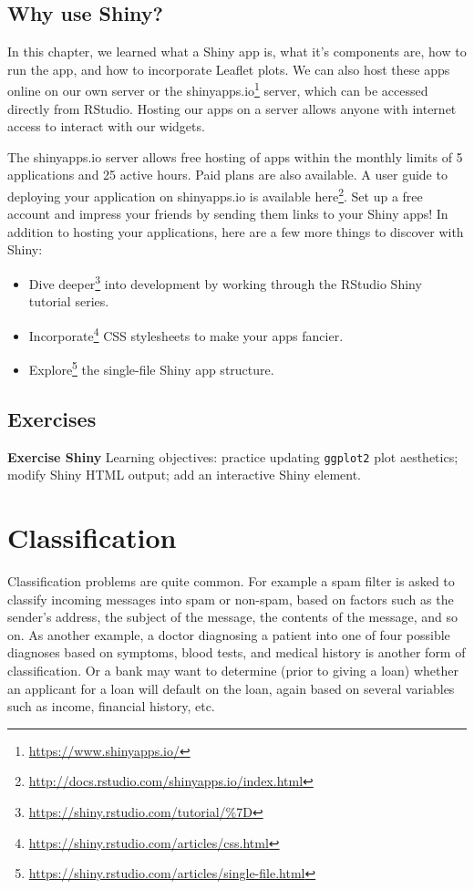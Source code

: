 \documentclass[]{krantz}
\providecommand{\tightlist}{%
  \setlength{\itemsep}{0pt}\setlength{\parskip}{0pt}}
\renewcommand{\href}[2]{#2\footnote{\url{#1}}}
\begin{document}
\section{Why use Shiny?}\label{why-use-shiny}

In this chapter, we learned what a Shiny app is, what it's components
are, how to run the app, and how to incorporate Leaflet plots. We can
also host these apps online on our own server or the
\href{https://www.shinyapps.io/}{shinyapps.io} server, which can be
accessed directly from RStudio. Hosting our apps on a server allows
anyone with internet access to interact with our widgets.

The shinyapps.io server allows free hosting of apps within the monthly
limits of 5 applications and 25 active hours. Paid plans are also
available. A user guide to deploying your application on shinyapps.io is
available \href{http://docs.rstudio.com/shinyapps.io/index.html}{here}.
Set up a free account and impress your friends by sending them links to
your Shiny apps! In addition to hosting your applications, here are a
few more things to discover with Shiny:

\begin{itemize}
\tightlist
\item
  \href{https://shiny.rstudio.com/tutorial/\%7D}{Dive deeper} into
  development by working through the RStudio Shiny tutorial series.
\item
  \href{https://shiny.rstudio.com/articles/css.html}{Incorporate} CSS
  stylesheets to make your apps fancier.
\item
  \href{https://shiny.rstudio.com/articles/single-file.html}{Explore}
  the single-file Shiny app structure.
\end{itemize}

\section{Exercises}\label{exercises-6}

\textbf{Exercise Shiny} Learning objectives: practice updating
\texttt{ggplot2} plot aesthetics; modify Shiny HTML output; add an
interactive Shiny element.

\chapter{Classification}\label{classification}

Classification problems are quite common. For example a spam filter is
asked to classify incoming messages into spam or non-spam, based on
factors such as the sender's address, the subject of the message, the
contents of the message, and so on. As another example, a doctor
diagnosing a patient into one of four possible diagnoses based on
symptoms, blood tests, and medical history is another form of
classification. Or a bank may want to determine (prior to giving a loan)
whether an applicant for a loan will default on the loan, again based on
several variables such as income, financial history, etc.
\end{document}
